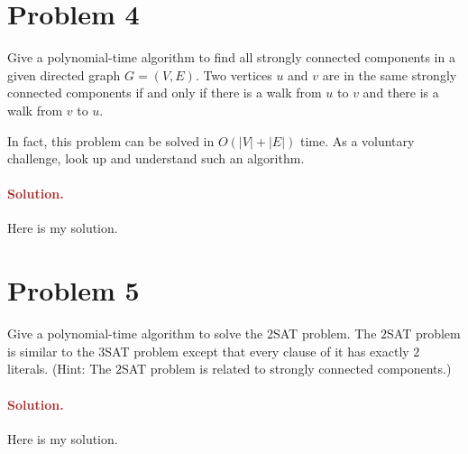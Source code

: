 \section*{Problem 4}
Give a polynomial-time algorithm to find all strongly connected components in a given directed graph $G = (V, E)$. Two vertices $u$ and $v$ are in the same strongly connected components if and only if there is a walk from $u$ to $v$ and there is a walk from $v$ to $u$.

In fact, this problem can be solved in $O(|V| + |E|)$ time. As a voluntary challenge, look up and understand such an algorithm.

\paragraph{\textcolor{brown}{Solution.}}
Here is my solution.


\section*{Problem 5}
Give a polynomial-time algorithm to solve the $2$SAT problem. The $2$SAT problem is similar to the $3$SAT problem except that every clause of it has exactly $2$ literals. (Hint: The $2$SAT problem is related to strongly connected components.)

\paragraph{\textcolor{brown}{Solution.}}
Here is my solution.

